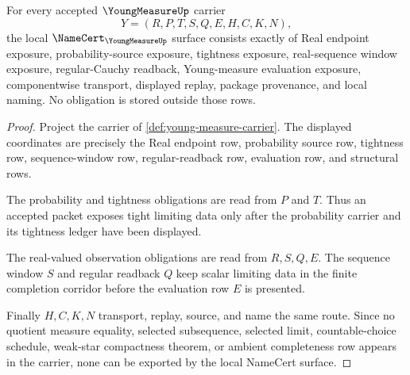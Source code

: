 \begin{theorem}
\label{thm:young-measure-namecert-obligations}
For every accepted $\YoungMeasureUp$ carrier
$$
Y=(R,P,T,S,Q,E,H,C,K,N),
$$
the local $\NameCert_{\YoungMeasureUp}$ surface consists exactly of Real endpoint exposure, probability-source exposure, tightness exposure, real-sequence window exposure, regular-Cauchy readback, Young-measure evaluation exposure, componentwise transport, displayed replay, package provenance, and local naming. No obligation is stored outside those rows.
\end{theorem}
\begin{proof}
Project the carrier of \autoref{def:young-measure-carrier}. The displayed coordinates are precisely the Real endpoint row, probability source row, tightness row, sequence-window row, regular-readback row, evaluation row, and structural rows.

The probability and tightness obligations are read from $P$ and $T$. Thus an accepted packet exposes tight limiting data only after the probability carrier and its tightness ledger have been displayed.

The real-valued observation obligations are read from $R,S,Q,E$. The sequence window $S$ and regular readback $Q$ keep scalar limiting data in the finite completion corridor before the evaluation row $E$ is presented.

Finally $H,C,K,N$ transport, replay, source, and name the same route. Since no quotient measure equality, selected subsequence, selected limit, countable-choice schedule, weak-star compactness theorem, or ambient completeness row appears in the carrier, none can be exported by the local NameCert surface.
\end{proof}

